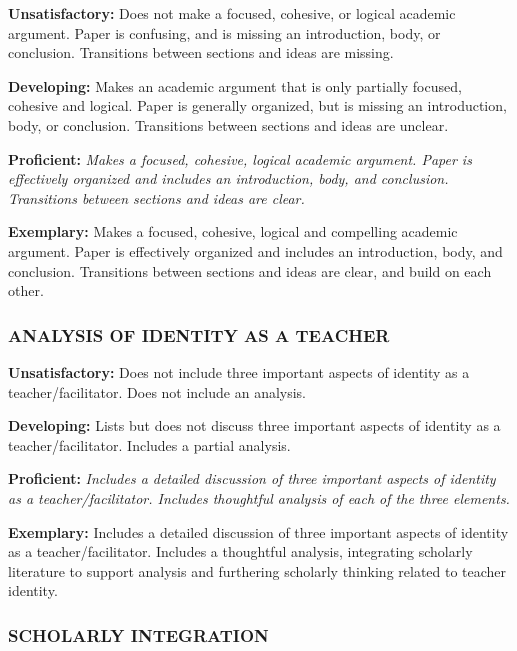 \documentclass[
]{book}
\begin{document}
\textbf{Unsatisfactory:} Does not make a focused, cohesive, or logical academic argument. Paper is confusing, and is missing an introduction, body, or conclusion. Transitions between sections and ideas are missing.

\textbf{Developing:} Makes an academic argument that is only partially focused, cohesive and logical. Paper is generally organized, but is missing an introduction, body, or conclusion. Transitions between sections and ideas are unclear.

\textbf{Proficient:} \emph{Makes a focused, cohesive, logical academic argument. Paper is effectively organized and includes an introduction, body, and conclusion. Transitions between sections and ideas are clear.}

\textbf{Exemplary:} Makes a focused, cohesive, logical and compelling academic argument. Paper is effectively organized and includes an introduction, body, and conclusion. Transitions between sections and ideas are clear, and build on each other.

\hypertarget{analysis-of-identity-as-a-teacher}{%
\subsubsection*{ANALYSIS OF IDENTITY AS A TEACHER}\label{analysis-of-identity-as-a-teacher}}

\textbf{Unsatisfactory:} Does not include three important aspects of identity as a teacher/facilitator. Does not include an analysis.

\textbf{Developing:} Lists but does not discuss three important aspects of identity as a teacher/facilitator. Includes a partial analysis.

\textbf{Proficient:} \emph{Includes a detailed discussion of three important aspects of identity as a teacher/facilitator. Includes thoughtful analysis of each of the three elements.}

\textbf{Exemplary:} Includes a detailed discussion of three important aspects of identity as a teacher/facilitator. Includes a thoughtful analysis, integrating scholarly literature to support analysis and furthering scholarly thinking related to teacher identity.

\hypertarget{scholarly-integration}{%
\subsubsection*{SCHOLARLY INTEGRATION}\label{scholarly-integration}}
\end{document}

